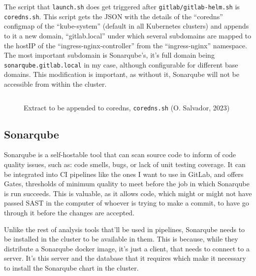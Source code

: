 \documentclass[11pt]{article}
\begin{document}
\begin{flushleft}
    The script that \texttt{launch.sh} does get triggered after \texttt{gitlab/gitlab-helm.sh} is \texttt{coredns.sh}. This script gets the JSON with the details of the ``coredns'' configmap of the ``kube-system'' (default in all Kubernetes clusters) and appends to it a new domain, ``gitlab.local'' under which several subdomains are mapped to the hostIP of the ``ingress-nginx-controller'' from the ``ingress-nginx'' namespace. The most important subdomain is Sonarqube's, it's full domain being \texttt{sonarqube.gitlab.local} in my case, although configurable for different base domains. This modification is important, as without it, Sonarqube will not be accessible from within the cluster. 
    \linebreak

        \begin{figure}[htb]
            \centering
            \begin{subfigure}{.7\textwidth}
                \hspace{-5cm}
                \inputminted[fontsize=\scriptsize, firstline=5, lastline=12, linenos, frame=single, tabsize=1, breaklines]{bash}{../../coredns.sh}
              \end{subfigure}
            \caption{Extract to be appended to coredns, \texttt{coredns.sh} (O. Salvador, 2023)}
        \end{figure}
    

    
    \clearpage
    \subsection{Sonarqube}
    Sonarqube is a self-hostable tool that can scan source code to inform of code quality issues, such as: code smells, bugs, or lack of unit testing coverage. It can be integrated into CI pipelines like the ones I want to use in GitLab, and offers Gates, thresholds of minimum quality to meet before the job in which Sonarqube is run succeeds. This is valuable, as it allows code, which might or might not have passed SAST in the computer of whoever is trying to make a commit, to have go through it before the changes are accepted.
    \linebreak

    Unlike the rest of analysis tools that'll be used in pipelines, Sonarqube needs to be installed in the cluster to be available in them. This is because, while they distribute a Sonarqube docker image, it's just a client, that needs to connect to a server. It's this server and the database that it requires which make it necessary to install the Sonarqube chart in the cluster. 
    \linebreak
    

\end{flushleft}
\end{document}
